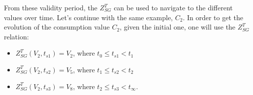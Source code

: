 From these validity period, the $Z^T_{SG}$ can be used to navigate to the different values over time.
Let's continue with the same example, $C_2$.
In order to get the evolution of the consumption value $C_2$, given the initial one, one will use the $Z^T_{SG}$ relation:
\begin{itemize}
	\item $Z^T_{SG}(V_2, t_{s1}) = V_2$, where $t_0 \leqslant t_{s1} < t_1$
	\item $Z^T_{SG}(V_2, t_{s2}) = V_5$, where $t_1 \leqslant t_{s2} < t_2$
	\item $Z^T_{SG}(V_2, t_{s3}) = V_8$, where $t_2 \leqslant t_{s3} < t_\infty$.
\end{itemize}



